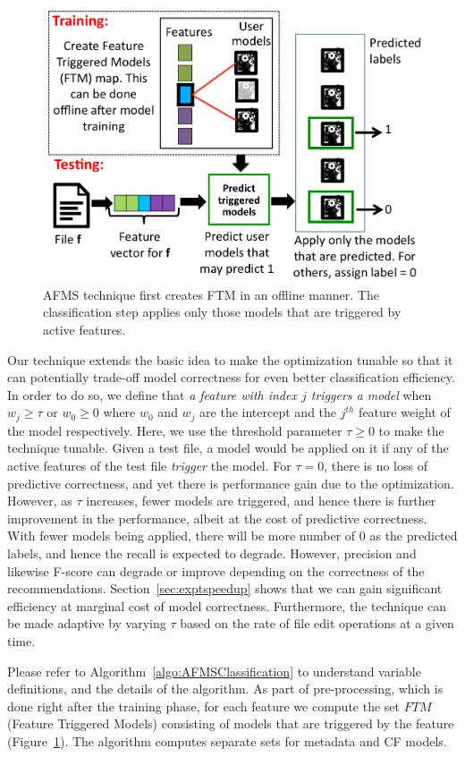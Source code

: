 \begin{figure}[htp]
\centering
\includegraphics[width=0.75\linewidth]{FileAccess/figs/framework_withspeedup.png} 
\caption{AFMS technique first creates FTM in an offline manner.  The
  classification step applies only those models that are triggered by
  active features.}
\label{fig:speedupframework}
\end{figure}
Our technique extends the basic idea to make the optimization tunable
so that it can potentially trade-off model correctness for even better classification
efficiency.  In order to do so, we
define that {\it a feature with index $j$ triggers a model} when $w_j
\ge \tau$ or $w_0 \ge 0$ where $w_0$ and $w_j$ are the intercept and the $j^{th}$ feature weight of the model respectively. Here, we use the threshold parameter $\tau
\ge 0$ to make the technique tunable. Given a test file, a model would be applied on it 
if any of the active features of the test file \textit{trigger} the model. 
For $\tau = 0$, there is no
loss of predictive correctness, and yet there is performance gain due to the
optimization.  However, as $\tau$ increases, fewer models are
triggered, and hence there is further improvement in the performance,
albeit at the cost of predictive correctness.  With fewer models being applied,
there will be more number of 0 as the predicted labels, and hence the
recall is expected to degrade.  However, precision and likewise
F-score can degrade or improve depending on the correctness of the recommendations.
Section~\ref{sec:exptspeedup} shows that we can gain significant
efficiency at marginal cost of model correctness.  Furthermore, the technique
can be made adaptive by varying $\tau$ based on the rate of file edit
operations at a given time.

Please refer to Algorithm~\ref{algo:AFMSClassification} to understand
variable definitions, and the details of the algorithm.  As part of
pre-processing, which is done right after the training phase, for each
feature we compute the set $FTM$ (Feature Triggered Models) consisting
of models that are triggered by the feature (Figure~\ref{fig:speedupframework}).  The algorithm computes
separate sets for metadata and CF models.

